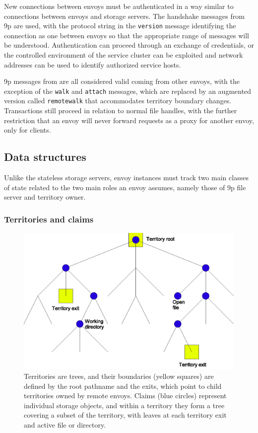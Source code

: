 New connections between envoys must be authenticated in a way similar to connections between envoys and storage servers. The handshake messages from 9p are used, with the protocol string in the \texttt{version} message identifying the connection as one between envoys so that the appropriate range of messages will be understood. Authentication can proceed through an exchange of credentials, or the controlled environment of the service cluster can be exploited and network addresses can be used to identify authorized service hosts.

9p messages from  are all considered valid coming from other envoys, with the exception of the \texttt{walk} and \texttt{attach} messages, which are replaced by an augmented version called \texttt{remotewalk} that accommodates territory boundary changes. Transactions still proceed in relation to normal file handles, with the further restriction that an envoy will never forward requests as a proxy for another envoy, only for clients.

\subsection{Data structures}

Unlike the stateless storage servers, envoy instances must track two main classes of state related to the two main roles an envoy assumes, namely those of 9p file server and territory owner.

\subsubsection{Territories and claims}

\begin{figure}[tp]
\centering
\includegraphics[width=\figwidth]{figures/territory-claims}
\caption[A territory managed by a single envoy]{Territories are trees, and their boundaries (yellow squares) are defined by the root pathname and the exits, which point to child territories owned by remote envoys. Claims (blue circles) represent individual storage objects, and within a territory they form a tree covering a subset of the territory, with leaves at each territory exit and active file or directory.}
\label{fig:territory-claims}
\end{figure}

